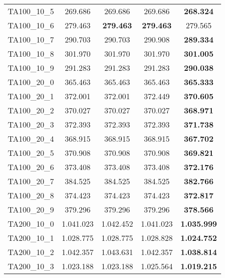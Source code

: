\begin{tabular}{cc|cc|c}
TA100\_10\_5       & 269.686          & 269.686          & 269.686          & {\bf 268.324}   \\ 
TA100\_10\_6       & 279.463          & {\bf 279.463}    & {\bf 279.463}    & 279.565         \\ 
TA100\_10\_7       & 290.703          & 290.703          & 290.908          & {\bf 289.334}   \\ 
TA100\_10\_8       & 301.970          & 301.970          & 301.970          & {\bf 301.005}   \\ 
TA100\_10\_9       & 291.283          & 291.283          & 291.283          & {\bf 290.038}   \\ 
TA100\_20\_0       & 365.463          & 365.463          & 365.463          & {\bf 365.333}   \\ 
TA100\_20\_1       & 372.001          & 372.001          & 372.449          & {\bf 370.605}   \\ 
TA100\_20\_2       & 370.027          & 370.027          & 370.027          & {\bf 368.971}   \\ 
TA100\_20\_3       & 372.393          & 372.393          & 372.393          & {\bf 371.738}   \\ 
TA100\_20\_4       & 368.915          & 368.915          & 368.915          & {\bf 367.702}   \\ 
TA100\_20\_5       & 370.908          & 370.908          & 370.908          & {\bf 369.821}   \\ 
TA100\_20\_6       & 373.408          & 373.408          & 373.408          & {\bf 372.176}   \\ 
TA100\_20\_7       & 384.525          & 384.525          & 384.525          & {\bf 382.766}   \\ 
TA100\_20\_8       & 374.423          & 374.423          & 374.423          & {\bf 372.817}   \\ 
TA100\_20\_9       & 379.296          & 379.296          & 379.296          & {\bf 378.566}   \\ 
TA200\_10\_0       & 1.041.023        & 1.042.452        & 1.041.023        & {\bf 1.035.999} \\ 
TA200\_10\_1       & 1.028.775        & 1.028.775        & 1.028.828        & {\bf 1.024.752} \\ 
TA200\_10\_2       & 1.042.357        & 1.043.631        & 1.042.357        & {\bf 1.038.814} \\ 
TA200\_10\_3       & 1.023.188        & 1.023.188        & 1.025.564        & {\bf 1.019.215} \\ 

\end{tabular}
